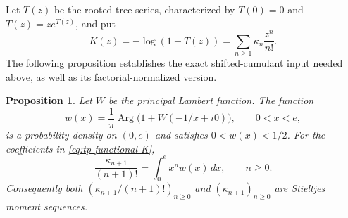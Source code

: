 \documentclass[11pt,a4paper]{article}
\newtheorem{proposition}[theorem]{Proposition}
\theoremstyle{definition}
\theoremstyle{remark}
\numberwithin{equation}{section}
\begin{document}
Let $T(z)$ be the rooted-tree series, characterized by $T(0)=0$ and
$T(z)=ze^{T(z)}$, and put
\begin{equation}
 K(z)=-\log(1-T(z))=\sum_{n\geq1}\kappa_n\frac{z^n}{n!}.
 \label{eq:tp-functional-K}
\end{equation}
The following proposition establishes the exact shifted-cumulant input
needed above, as well as its factorial-normalized version.

\begin{proposition}
\label{prop:tp-Lambert-measure}
Let $W$ be the principal Lambert function.  The function
\begin{equation}
 w(x)=\frac1\pi\operatorname{Arg}\bigl(1+W(-1/x+i0)\bigr),
 \qquad 0<x<e,
 \label{eq:tp-density}
\end{equation}
is a probability density on $(0,e)$ and satisfies $0<w(x)<1/2$.
For the coefficients in \eqref{eq:tp-functional-K},
\begin{equation}
 \frac{\kappa_{n+1}}{(n+1)!}
   =\int_0^e x^n w(x)\,dx,\qquad n\geq0.
 \label{eq:tp-normalized-moments}
\end{equation}
Consequently both $(\kappa_{n+1}/(n+1)!)_{n\geq0}$ and
$(\kappa_{n+1})_{n\geq0}$ are Stieltjes moment sequences.
\end{proposition}
\end{document}
